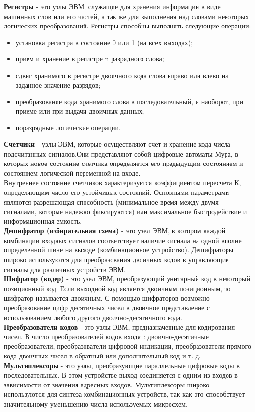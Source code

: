 \textbf{Регистры} - это узлы ЭВМ, служащие для хранения информации в виде машинных слов или его частей, а так же для выполнения над словами некоторых логических преобразований.
Регистры способны выполнять следующие операции:
\begin{itemize}
  \item установка регистра в состояние 0 или 1 (на всех выходах);
  \item прием и хранение в регистре n разрядного слова;
  \item сдвиг хранимого в регистре двоичного кода слова вправо или влево на заданное значение разрядов;
  \item преобразование кода хранимого слова в последовательный, и наоборот, при приеме или при выдачи двоичных данных;
  \item поразрядные логические операции.
\end{itemize}
\textbf{Счетчики} - узлы ЭВМ, которые осуществляют счет и хранение кода числа подсчитанных сигналов.Они представляют собой цифровые автоматы Мура, в которых новое состояние счетчика определяется его предыдущим состоянием и состоянием логической переменной на входе.
\\Внутреннее состояние счетчиков характеризуется коэффициентом пересчета К, определяющим число его устойчивых состояний. Основными параметрами являются разрешающая способность (минимальное время между двумя сигналами, которые надежно фиксируются) или максимальное быстродействие и информационная емкость.
\\\textbf{Дешифратор (избирательная схема)} - это узел ЭВМ, в котором каждой комбинации входных сигналов соответствует наличие сигнала на одной вполне определенной шине на выходе (комбинационное устройство). Дешифраторы широко используются для преобразования двоичных кодов в управляющие сигналы для различных устройств ЭВМ.
\\\textbf{Шифратор (кодер)} - это узел ЭВМ, преобразующий унитарный код в некоторый позиционный код. Если выходной код является двоичным позиционным, то шифратор называется двоичным. С помощью шифраторов возможно преобразование цифр десятичных чисел в двоичное представление с использованием любого другого двоично-десятичного кода.
\\\textbf{Преобразователи кодов} - это узлы ЭВМ, предназначенные для кодирования чисел. В число преобразователей кодов входят: двоично-десятичные преобразователи, преобразователи цифровой индикации, преобразователи прямого кода двоичных чисел в обратный или дополнительный код и т. д.
\\\textbf{Мультиплексоры} - это узлы, преобразующие параллельные цифровые коды в последовательные. В этом устройстве выход соединяется с одним из входов в зависимости от значения адресных входов. Мультиплексоры широко используются для синтеза комбинационных устройств, так как это способствует значительному уменьшению числа используемых микросхем.
